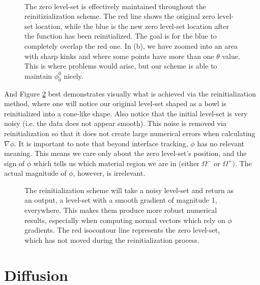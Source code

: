\documentclass[oneside,12pt,final]{/Applications/TeX/packages/ucthesis-CA2012}
\begin{document}
\begin{mainmatter}
\begin{figure} [!h]
 \\
  \caption[Maintaining the Zero Level-Set During Reinitialization]{The zero level-set is effectively maintained throughout the reinitizialization scheme. The red line shows the original zero level-set location, while the blue is the new zero level-set location after the function has been reinitialized. The goal is for the blue to completely overlap the red one. In (b), we have zoomed into an area with sharp kinks and where some points have more than one $\theta$ value. This is where problems would arise, but our scheme is able to maintain $\phi_0^0$ nicely.}
  \label{fig:reinitialization_1}
\end{figure}
And Figure \ref{fig:reinitialization_2} best demonstrates visually what is achieved via the reinitialization method, where one will notice our original level-set shaped as a bowl is reinitialized into a cone-like shape. Also notice that the initial level-set is very noisy (i.e. the data does not appear smooth). This noise is removed via reinitialization so that it does not create large numerical errors when calculating $\nabla \phi$. It is important to note that beyond interface tracking, $\phi$ has no relevant meaning. This means we care only about the zero level-set's position, and the sign of $\phi$ which tells us which material region we are in (either $\Omega^-$ or $\Omega^+)$. The actual magnitude of $\phi$, however, is irrelevant.
\begin{figure} [!h]
\centering
{} \quad
{}
  \caption[Reinitializing the Level-Set]{The reinitialization scheme will take a noisy level-set and return as an output, a level-set with a smooth gradient of magnitude 1, everywhere. This makes them produce more robust numerical results, especially when computing normal vectors which rely on $\phi$ gradients. The red isocontour line represents the zero level-set, which has not moved during the reinitialization process.}
  \label{fig:reinitialization_2}
\end{figure}

\chapter{Diffusion}\label{section:Diffusion}


\end{mainmatter}
\end{document}

